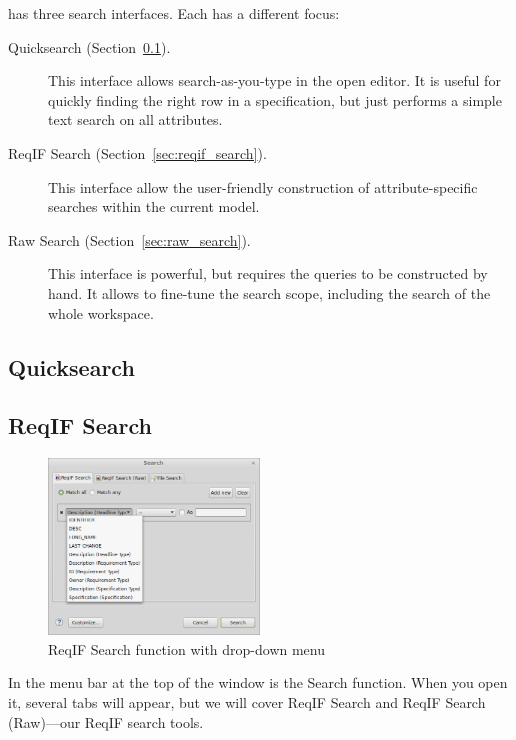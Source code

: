 {{{\pror{} has three search interfaces.  Each has a different focus:

\begin{description}
\item[Quicksearch (Section~\ref{sec:quicksearch}).] This interface allows search-as-you-type in the open editor.  It is useful for quickly finding the right row in a specification, but just performs a simple text search on all attributes.
\item[ReqIF Search (Section~\ref{sec:reqif_search}).] This interface allow the user-friendly construction of attribute-specific searches within the current model.
\item[Raw Search (Section~\ref{sec:raw_search}).] This interface is powerful, but requires the queries to be constructed by hand.  It allows to fine-tune the search scope, including the search of the whole workspace.
\end{description}

\subsection{Quicksearch}
\label{sec:quicksearch}

\subsection{ReqIF Search}
\begin{figure}[!h]
  \centering
  \includegraphics[width=0.5\textwidth]{../rmf-images/reqIF_search_1.png}
  \caption{ReqIF Search function with drop-down menu}
  \label{fig:ReqIF Search Window}
\end{figure}
\label{sec:reqif_search}
In the menu bar at the top of the window is the Search function. When you open it, several tabs will appear, but we will cover ReqIF Search and ReqIF Search (Raw)---our ReqIF search tools.

}}}
